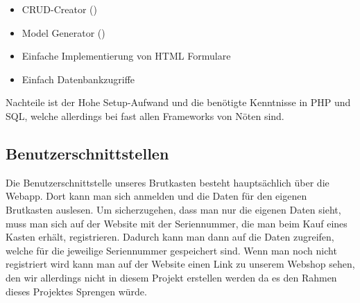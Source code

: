 \begin{itemize}
	\item CRUD-Creator ()
	\item Model Generator ()
	\item Einfache Implementierung von HTML Formulare
	\item Einfach Datenbankzugriffe
\end{itemize}

Nachteile ist der Hohe Setup-Aufwand und die benötigte Kenntnisse in PHP und SQL, welche allerdings bei fast allen Frameworks von Nöten sind.


\subsection{Benutzerschnittstellen} 

Die Benutzerschnittstelle unseres Brutkasten besteht hauptsächlich über die Webapp. Dort kann man sich anmelden und die Daten für den eigenen Brutkasten auslesen. Um sicherzugehen, dass man nur die eigenen Daten sieht, muss man sich auf der Website mit der Seriennummer, die man beim Kauf eines Kasten erhält, registrieren. Dadurch kann man dann auf die Daten zugreifen, welche für die jeweilige Seriennummer gespeichert sind.
\newline
Wenn man noch nicht registriert wird kann man auf der Website einen Link zu unserem Webshop sehen, den wir allerdings nicht in diesem Projekt erstellen werden da es den Rahmen dieses Projektes Sprengen würde.
\newpage
